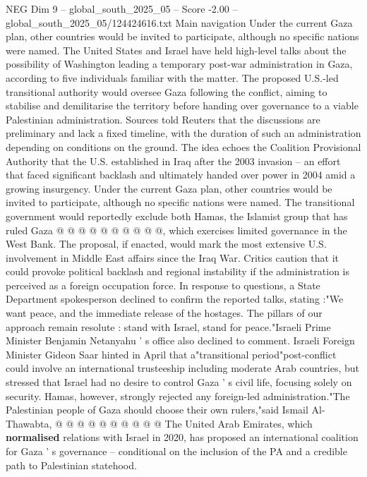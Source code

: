 \begin{textsample}{NEG Dim 9 – global\_south\_2025\_05 – Score -2.00 – global\_south\_2025\_05/124424616.txt}  \label{ex:f9_neg_254}
Main navigation Under the current Gaza plan, other countries would be invited to participate, although no specific nations were named.
The United States and Israel have held high-level talks about the possibility of Washington leading a temporary post-war administration in Gaza, according to five individuals familiar with the matter.
The proposed U.S.-led transitional authority would oversee Gaza following the conflict, aiming to stabilise and demilitarise the territory before handing over governance to a viable Palestinian administration.
Sources told Reuters that the discussions are preliminary and lack a fixed timeline, with the duration of such an administration depending on conditions on the ground.
The idea echoes the Coalition Provisional Authority that the U.S. established in Iraq after the 2003 invasion -- an effort that faced significant backlash and ultimately handed over power in 2004 amid a growing insurgency.
Under the current Gaza plan, other countries would be invited to participate, although no specific nations were named.
The transitional government would reportedly exclude both Hamas, the Islamist group that has ruled Gaza @ @ @ @ @ @ @ @ @ @, which exercises limited governance in the West Bank.
The proposal, if enacted, would mark the most extensive U.S. involvement in Middle East affairs since the Iraq War.
Critics caution that it could provoke political backlash and regional instability if the administration is perceived as a foreign occupation force.
In response to questions, a State Department spokesperson declined to confirm the reported talks, stating :"We want peace, and the immediate release of the hostages.
The pillars of our approach remain resolute : stand with Israel, stand for peace."Israeli Prime Minister Benjamin Netanyahu ' s office also declined to comment.
Israeli Foreign Minister Gideon Saar hinted in April that a"transitional period"post-conflict could involve an international trusteeship including moderate Arab countries, but stressed that Israel had no desire to control Gaza ' s civil life, focusing solely on security.
Hamas, however, strongly rejected any foreign-led administration."The Palestinian people of Gaza should choose their own rulers,"said Ismail Al-Thawabta, @ @ @ @ @ @ @ @ @ @ The United Arab Emirates, which \textbf{normalised} relations with Israel in 2020, has proposed an international coalition for Gaza ' s governance -- conditional on the inclusion of the PA and a credible path to Palestinian statehood.

\end{textsample}
